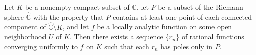 Let $K$ be a nonempty compact subset of $\mathbb{C}$, let $P$ be a subset of the Riemann sphere $\hat{\mathbb{C}}$ with the property that $P$ contains at least one point of each connected component of $\hat{\mathbb{C}} \setminus K$, and let $f$ be a locally analytic function on some open neighborhood $U$ of $K$. Then there exists a sequence $\{r_n\}$ of rational functions converging uniformly to $f$ on $K$ such that each $r_n$ has poles only in $P$.
